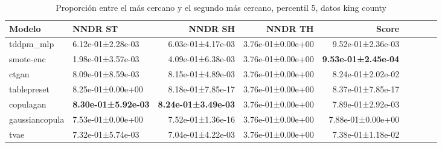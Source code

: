 \begin{table}[H]
\centering
\fontsize{10}{14}\selectfont
\caption{Proporción entre el más cercano y el segundo más cercano, percentil 5, datos king county}
\label{table-dcr-king county-a}
\begin{tabular}{|l|l|r|r|r|r|r|r|r|}
\hline
\rowcolor[gray]{0.8}
Modelo & NNDR ST & NNDR SH & NNDR TH & \textbf{Score} \\
\hline tddpm\_mlp & 6.12e-01±2.28e-03 & 6.03e-01±4.17e-03 & 3.76e-01±0.00e+00 & 9.52e-01±2.36e-03 \\
\hline smote-enc & \cellcolor[rgb]{0.9, 0.54, 0.52} 1.98e-01±3.57e-03 & \cellcolor[rgb]{0.9, 0.54, 0.52} 4.09e-01±6.38e-03 & 3.76e-01±0.00e+00 & \bfseries 9.53e-01±2.45e-04 \\
\hline ctgan & 8.09e-01±8.59e-03 & 8.15e-01±4.89e-03 & 3.76e-01±0.00e+00 & 8.24e-01±2.02e-02 \\
\hline tablepreset & 8.25e-01±0.00e+00 & 8.18e-01±7.85e-17 & 3.76e-01±0.00e+00 & 8.37e-01±7.85e-17 \\
\hline copulagan & \bfseries 8.30e-01±5.92e-03 & \bfseries 8.24e-01±3.49e-03 & 3.76e-01±0.00e+00 & 7.89e-01±2.92e-03 \\
\hline gaussiancopula & 7.53e-01±0.00e+00 & 7.52e-01±1.36e-16 & 3.76e-01±0.00e+00 & 7.88e-01±0.00e+00 \\
\hline tvae & 7.32e-01±5.74e-03 & 7.04e-01±4.22e-03 & 3.76e-01±0.00e+00 & \cellcolor[rgb]{0.9, 0.54, 0.52} 7.38e-01±1.18e-02 \\
\hline
\end{tabular}
\end{table}
